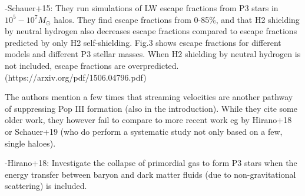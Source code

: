 \documentclass[11pt]{article}
\newenvironment{referee}[1][]{%
    \ignorespaces%
    \begin{mdframed}[style=myquotestyle,#1]%
}{%
    \end{mdframed}%
    \ignorespacesafterend%
}%
\begin{document}
-Schauer+15: They run simulations of LW escape fractions from P3 stars in $10^5 - 10^7 M_{\odot}$ halos. They find escape fractions from 0-85\%, and that H2 shielding by neutral hydrogen also decreases escape fractions compared to escape fractions predicted by only H2 self-shielding. Fig.3 shows escape fractions for different models and different P3 stellar masses. When H2 shielding by neutral hydrogen is not included, escape fractions are overpredicted. (https://arxiv.org/pdf/1506.04796.pdf)

\begin{referee}
The authors mention a few times that streaming velocities are another pathway of suppressing Pop III formation (also in the introduction). While they cite some older work, they however fail to compare to more recent work eg by Hirano+18 or Schauer+19 (who do perform a systematic study not only based on a few, single haloes).
\end{referee}
-Hirano+18: Investigate the collapse of primordial gas to form P3 stars when the energy transfer between baryon and dark matter fluids (due to non-gravitational scattering) is included.
\end{document}
